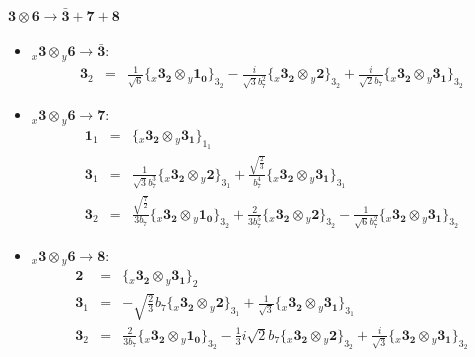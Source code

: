 \documentclass[english]{article}
\newcommand{\rep}[1]{\mathbf{#1}}
\newcommand{\repx}[2]{{}_{#2}\mathbf{#1}}
\newcommand{\subcg}[3]{\big\{ \repx{#1}{x}\otimes\repx{#2}{y}\big\}^{}_{#3}}
\begin{document}
\paragraph*{\Large $\rep{3}\otimes\rep{6}\to\rep{\bar{3}}+\rep{7}+\rep{8}$}
\begin{itemize}
\item $\repx{3}{x}\otimes\repx{6}{y}\to\rep{\bar{3}}$:
\begin{eqnarray*}
\rep{3}_{2} &=& \frac{1}{\sqrt{6}}\subcg{3_{2}}{1_{0}}{3_{2}}-\frac{i}{\sqrt{3} b_7^2}\subcg{3_{2}}{2}{3_{2}}+\frac{i}{\sqrt{2} b_7}\subcg{3_{2}}{3_{1}}{3_{2}}
\end{eqnarray*}
\item $\repx{3}{x}\otimes\repx{6}{y}\to\rep{7}$:
\begin{eqnarray*}
\rep{1}_{1} &=& \subcg{3_{2}}{3_{1}}{1_{1}}
\\
\rep{3}_{1} &=& \frac{1}{\sqrt{3} b_7^3}\subcg{3_{2}}{2}{3_{1}}+\frac{\sqrt{\frac{2}{3}}}{b_7^4}\subcg{3_{2}}{3_{1}}{3_{1}}
\\
\rep{3}_{2} &=& \frac{\sqrt{\frac{7}{2}}}{3 b_7}\subcg{3_{2}}{1_{0}}{3_{2}}+\frac{2}{3 b_7^5}\subcg{3_{2}}{2}{3_{2}}-\frac{1}{\sqrt{6} b_7^2}\subcg{3_{2}}{3_{1}}{3_{2}}
\end{eqnarray*}
\item $\repx{3}{x}\otimes\repx{6}{y}\to\rep{8}$:
\begin{eqnarray*}
\rep{2} &=& \subcg{3_{2}}{3_{1}}{2}
\\
\rep{3}_{1} &=& -\sqrt{\frac{2}{3}} b_7\subcg{3_{2}}{2}{3_{1}}+\frac{1}{\sqrt{3}}\subcg{3_{2}}{3_{1}}{3_{1}}
\\
\rep{3}_{2} &=& \frac{2}{3 b_7}\subcg{3_{2}}{1_{0}}{3_{2}}-\frac{1}{3} i \sqrt{2} b_7\subcg{3_{2}}{2}{3_{2}}+\frac{i}{\sqrt{3}}\subcg{3_{2}}{3_{1}}{3_{2}}
\end{eqnarray*}
\end{itemize}
\end{document}
